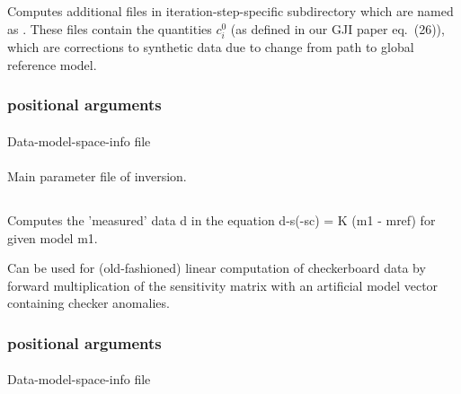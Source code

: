 \subsection{} \label{programs_scripts,sec:bin_prog,sec:comp_correct_syn_data}
Computes additional files in iteration-step-specific subdirectory  which are named as
. These files contain the quantities $c_i^0$ (as defined in our GJI paper
eq.\ (26)), which are corrections to synthetic data due to change from path to global reference model.
\subsubsection{positional arguments}
\paragraph{}
Data-model-space-info file
\paragraph{}
Main parameter file of inversion.
%
%
\subsection{} \label{programs_scripts,sec:bin_prog,sec:comp_data_kernel_sys}
Computes the 'measured' data d in the equation  d-s(-sc) = K (m1 - mref)  for given model m1.

Can be used for (old-fashioned) linear computation of checkerboard data by forward multiplication of the sensitivity 
matrix with an artificial model vector containing checker anomalies.
\subsubsection{positional arguments}
\paragraph{}
Data-model-space-info file
